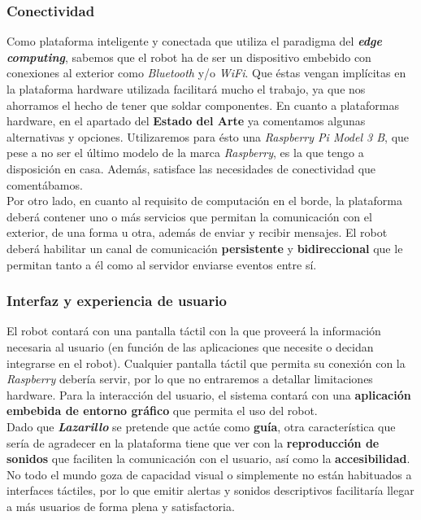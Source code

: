 \subsubsection{Conectividad}

Como plataforma inteligente y conectada que utiliza el paradigma del \textbf{\textit{edge computing}}, sabemos que el robot ha de ser un dispositivo embebido con conexiones al exterior como \textit{Bluetooth} y/o \textit{WiFi}. Que éstas vengan implícitas en la plataforma hardware utilizada facilitará mucho el trabajo, ya que nos ahorramos el hecho de tener que soldar componentes. En cuanto a plataformas hardware, en el apartado del \textbf{Estado del Arte} ya comentamos algunas alternativas y opciones. Utilizaremos para ésto una \textit{Raspberry Pi Model 3 B}, que pese a no ser el último modelo de la marca \textit{Raspberry}, es la que tengo a disposición en casa. Además, satisface las necesidades de conectividad que comentábamos.\\

Por otro lado, en cuanto al requisito de computación en el borde, la plataforma deberá contener uno o más servicios que permitan la comunicación con el exterior, de una forma u otra, además de enviar y recibir mensajes. El robot deberá habilitar un canal de comunicación \textbf{persistente} y \textbf{bidireccional} que le permitan tanto a él como al servidor enviarse eventos entre sí.\\


\subsubsection{Interfaz y experiencia de usuario}

El robot contará con una pantalla táctil con la que proveerá la información necesaria al usuario (en función de las aplicaciones que necesite o decidan integrarse en el robot). Cualquier pantalla táctil que permita su conexión con la \textit{Raspberry} debería servir, por lo que no entraremos a detallar limitaciones hardware. Para la interacción del usuario, el sistema contará con una \textbf{aplicación embebida de entorno gráfico} que permita el uso del robot.\\

Dado que \textbf{\textit{Lazarillo}} se pretende que actúe como \textbf{guía}, otra característica que sería de agradecer en la plataforma tiene que ver con la \textbf{reproducción de sonidos} que faciliten la comunicación con el usuario, así como la \textbf{accesibilidad}. No todo el mundo goza de capacidad visual o simplemente no están habituados a interfaces táctiles, por lo que emitir alertas y sonidos descriptivos facilitaría llegar a más usuarios de forma plena y satisfactoria.\\


